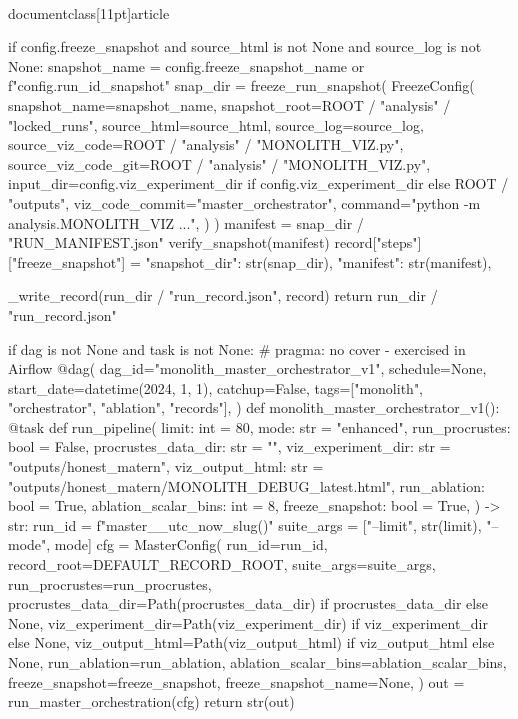 \\documentclass[11pt]{article}
\begin{document}
\begin{CodeBlock}
    if config.freeze_snapshot and source_html is not None and source_log is not None:
        snapshot_name = config.freeze_snapshot_name or f"{config.run_id}_snapshot"
        snap_dir = freeze_run_snapshot(
            FreezeConfig(
                snapshot_name=snapshot_name,
                snapshot_root=ROOT / "analysis" / "locked_runs",
                source_html=source_html,
                source_log=source_log,
                source_viz_code=ROOT / "analysis" / "MONOLITH_VIZ.py",
                source_viz_code_git=ROOT / "analysis" / "MONOLITH_VIZ.py",
                input_dir=config.viz_experiment_dir if config.viz_experiment_dir else ROOT / "outputs",
                viz_code_commit="master_orchestrator",
                command="python -m analysis.MONOLITH_VIZ ...",
            )
        )
        manifest = snap_dir / "RUN_MANIFEST.json"
        verify_snapshot(manifest)
        record["steps"]["freeze_snapshot"] = {
            "snapshot_dir": str(snap_dir),
            "manifest": str(manifest),
        }

    _write_record(run_dir / "run_record.json", record)
    return run_dir / "run_record.json"


if dag is not None and task is not None:  # pragma: no cover - exercised in Airflow
    @dag(
        dag_id="monolith_master_orchestrator_v1",
        schedule=None,
        start_date=datetime(2024, 1, 1),
        catchup=False,
        tags=["monolith", "orchestrator", "ablation", "records"],
    )
    def monolith_master_orchestrator_v1():
        @task
        def run_pipeline(
            limit: int = 80,
            mode: str = "enhanced",
            run_procrustes: bool = False,
            procrustes_data_dir: str = "",
            viz_experiment_dir: str = "outputs/honest_matern",
            viz_output_html: str = "outputs/honest_matern/MONOLITH_DEBUG_latest.html",
            run_ablation: bool = True,
            ablation_scalar_bins: int = 8,
            freeze_snapshot: bool = True,
        ) -> str:
            run_id = f"master_{_utc_now_slug()}"
            suite_args = ["--limit", str(limit), "--mode", mode]
            cfg = MasterConfig(
                run_id=run_id,
                record_root=DEFAULT_RECORD_ROOT,
                suite_args=suite_args,
                run_procrustes=run_procrustes,
                procrustes_data_dir=Path(procrustes_data_dir) if procrustes_data_dir else None,
                viz_experiment_dir=Path(viz_experiment_dir) if viz_experiment_dir else None,
                viz_output_html=Path(viz_output_html) if viz_output_html else None,
                run_ablation=run_ablation,
                ablation_scalar_bins=ablation_scalar_bins,
                freeze_snapshot=freeze_snapshot,
                freeze_snapshot_name=None,
            )
            out = run_master_orchestration(cfg)
            return str(out)


\end{CodeBlock}
\end{document}
